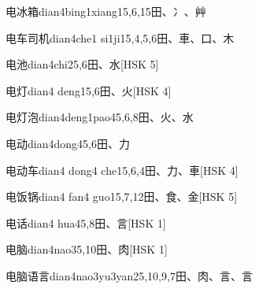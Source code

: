 \begin{entry}{电冰箱}{dian4bing1xiang1}{5,6,15}{⽥、⼎、⾋}
\end{entry}

\begin{entry}{电车司机}{dian4che1 si1ji1}{5,4,5,6}{⽥、⾞、⼝、⽊}
\end{entry}

\begin{entry}{电池}{dian4chi2}{5,6}{⽥、⽔}[HSK 5]
\end{entry}

\begin{entry}{电灯}{dian4 deng1}{5,6}{⽥、⽕}[HSK 4]
\end{entry}

\begin{entry}{电灯泡}{dian4deng1pao4}{5,6,8}{⽥、⽕、⽔}
\end{entry}

\begin{entry}{电动}{dian4dong4}{5,6}{⽥、⼒}
\end{entry}

\begin{entry}{电动车}{dian4 dong4 che1}{5,6,4}{⽥、⼒、⾞}[HSK 4]
\end{entry}

\begin{entry}{电饭锅}{dian4 fan4 guo1}{5,7,12}{⽥、⾷、⾦}[HSK 5]
\end{entry}

\begin{entry}{电话}{dian4 hua4}{5,8}{⽥、⾔}[HSK 1]
\end{entry}

\begin{entry}{电脑}{dian4nao3}{5,10}{⽥、⾁}[HSK 1]
\end{entry}

\begin{entry}{电脑语言}{dian4nao3yu3yan2}{5,10,9,7}{⽥、⾁、⾔、⾔}
\end{entry}

